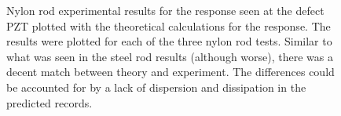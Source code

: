 \documentclass[11pt,letterpaper]{article}%
\begin{document}
 \begin{figure}
\begin{subfigmatrix}{3}
\end{subfigmatrix}

   \caption[all]
   { \label{nylonThExp}
Nylon rod experimental results for the response seen at the defect PZT plotted with the theoretical calculations for the response. The results were plotted for each of the three nylon rod tests. Similar to what was seen in the steel rod results (although worse),  there was a decent match between theory and experiment. The differences could be accounted for by a lack of dispersion and dissipation in the predicted records.
 }
 \end{figure}
\end{document}
